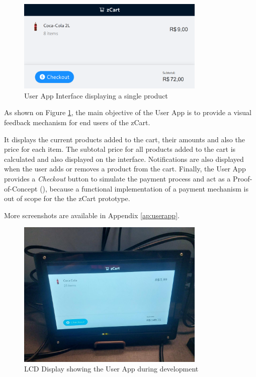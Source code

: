 \documentclass[openright]{normas-utf-tex} %
\begin{document}
\begin{figure}[H]
	\centering
	\includegraphics[width=0.8\textwidth]{./images/ui.png}
	\caption[User App Interface display a single product]{User App Interface displaying a single product}
	\label{fig:userapp}
\end{figure}

As shown on Figure \ref{fig:userapp}, the main objective of the User App is to
provide a visual feedback mechanism for end users of the zCart.

It displays the current products added to the cart, their amounts and also the
price for each item. The subtotal price for all products added to the cart is
calculated and also displayed on the interface. Notifications are also
displayed when the user adds or removes a product from the cart. Finally, the
User App provides a \textit{Checkout} button to simulate the payment process
and act as a Proof-of-Concept (), because a functional
implementation of a payment mechanism is out of scope for the the zCart prototype.

More screenshots are available in Appendix \ref{ap:userapp}.

\begin{figure}[H]
	\centering
	\includegraphics[width=0.8\textwidth]{./images/lcddisplay.jpeg}
	\caption[LCD Display showing the User App during development]{LCD Display showing the User App during development}
	\label{fig:dummy}
\end{figure}
\end{document}
